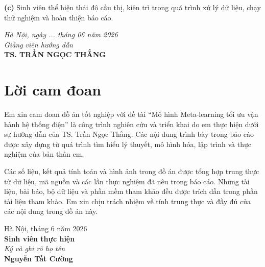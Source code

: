\documentclass[12pt, a4paper]{report}
\begin{document}
\hspace*{0.7cm}\textbf{(c)} Sinh viên thể hiện thái độ cầu thị, kiên trì trong quá trình xử lý dữ liệu, chạy thử nghiệm và hoàn thiện báo cáo.

\vspace{1.0cm}
\begin{flushright}
  \begin{minipage}{0.45\linewidth}
    \centering
    \textit{Hà Nội, ngày ... tháng 06 năm 2026}\\
    \textit{Giảng viên hướng dẫn}\\[1.9cm]
    \textbf{TS. TRẦN NGỌC THẮNG}
  \end{minipage}
\end{flushright}
\endgroup

\vfill


\newpage
\thispagestyle{plain}
\setcounter{page}{1}

\chapter*{Lời cam đoan}

\hspace*{\parindent}
Em xin cam đoan đồ án tốt nghiệp với đề tài ``Mô hình Meta-learning tối ưu vận hành hệ thống điện'' là công trình nghiên cứu và triển khai do em thực hiện dưới sự hướng dẫn của TS. Trần Ngọc Thắng. Các nội dung trình bày trong báo cáo được xây dựng từ quá trình tìm hiểu lý thuyết, mô hình hóa, lập trình và thực nghiệm của bản thân em.

Các số liệu, kết quả tính toán và hình ảnh trong đồ án được tổng hợp trung thực từ dữ liệu, mã nguồn và các lần thực nghiệm đã nêu trong báo cáo. Những tài liệu, bài báo, bộ dữ liệu và phần mềm tham khảo đều được trích dẫn trong phần tài liệu tham khảo. Em xin chịu trách nhiệm về tính trung thực và đầy đủ của các nội dung trong đồ án này.

\vfill
\begin{flushright}
  \begin{minipage}{0.45\linewidth}
    \centering
    Hà Nội, tháng 6 năm 2026\\[8pt]
    \textbf{Sinh viên thực hiện}\\[4pt]
    \textit{Ký và ghi rõ họ tên}\\[60pt]
    \textbf{Nguyễn Tất Cường}
  \end{minipage}
\end{flushright}
\end{document}
